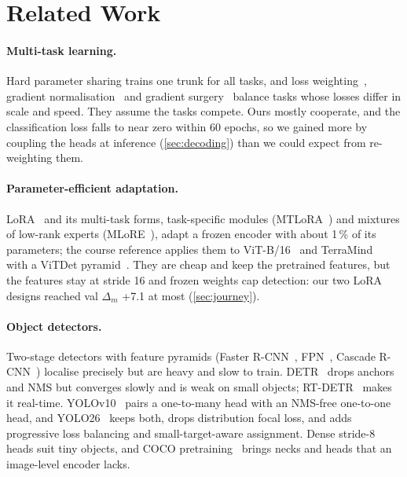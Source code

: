 \section{Related Work}
\label{sec:related}

\paragraph{Multi-task learning.}
Hard parameter sharing trains one trunk for all tasks, and loss weighting~\cite{kendall2018multi}, gradient
normalisation~\cite{chen2018gradnorm} and gradient surgery~\cite{yu2020pcgrad} balance tasks whose losses differ in
scale and speed.
They assume the tasks compete.
Ours mostly cooperate, and the classification loss falls to near zero within 60 epochs, so we gained more by coupling
the heads at inference (\cref{sec:decoding}) than we could expect from re-weighting them.

\paragraph{Parameter-efficient adaptation.}
LoRA~\cite{hu2022lora} and its multi-task forms, task-specific modules (MTLoRA~\cite{agiza2024mtlora}) and mixtures of
low-rank experts (MLoRE~\cite{yang2024mlore}), adapt a frozen encoder with about 1\,\% of its parameters; the course
reference applies them to ViT-B/16~\cite{dosovitskiy2021vit} and TerraMind~\cite{jakubik2025terramind} with a ViTDet
pyramid~\cite{li2022vitdet}.
They are cheap and keep the pretrained features, but the features stay at stride 16 and frozen weights cap detection:
our two LoRA designs reached val $\Delta_m$ +7.1 at most (\cref{sec:journey}).

\paragraph{Object detectors.}
Two-stage detectors with feature pyramids (Faster R-CNN~\cite{ren2015faster}, FPN~\cite{lin2017fpn}, Cascade
R-CNN~\cite{cai2018cascade}) localise precisely but are heavy and slow to train.
DETR~\cite{carion2020detr} drops anchors and NMS but converges slowly and is weak on small objects;
RT-DETR~\cite{zhao2024rtdetr} makes it real-time.
YOLOv10~\cite{wang2024yolov10} pairs a one-to-many head with an NMS-free one-to-one head, and YOLO26~\cite{jocher2026yolo26}
keeps both, drops distribution focal loss, and adds progressive loss balancing and small-target-aware assignment.
Dense stride-8 heads suit tiny objects, and COCO pretraining~\cite{lin2014coco} brings necks and heads that an
image-level encoder lacks.

